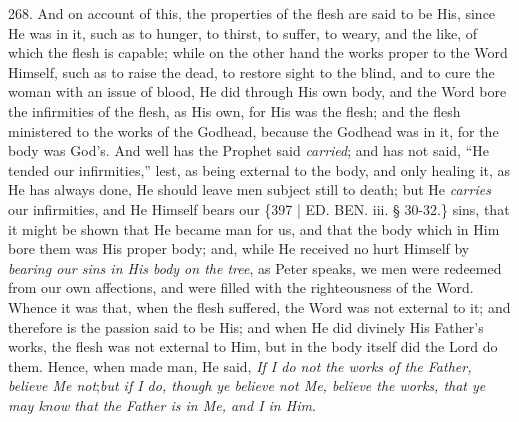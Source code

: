 268. And on account of
this, the properties of the flesh are said to be His, since He was in
it, such as to hunger, to thirst, to suffer, to weary, and the like,
of which the flesh is capable; while on the other hand the works
proper to the Word Himself, such as to raise the dead, to restore
sight to the blind, and to cure the woman with an issue of blood, He
did through His own body, and the Word bore the infirmities of the
flesh, as His own, for His was the flesh; and the flesh ministered to
the works of the Godhead, because the Godhead was in it, for the body
was God's. And well has the Prophet said \emph{carried}; and has not
said, ``He tended our infirmities,'' lest, as being external to the
body, and only healing it, as He has always done, He should leave men
subject still to death; but He \emph{carries} our infirmities, and He
Himself bears our \{397 | ED.
BEN.
iii. § 30-32.\} sins, that it might be shown that He became man for
us, and that the body which in Him bore them was His proper body; and,
while He received no hurt Himself by \emph{bearing our sins in His body
on the tree}, as Peter speaks, we men were redeemed from our own
affections, and were filled with the righteousness of the Word. Whence
it was that, when the flesh suffered, the Word was not external to it;
and therefore is the passion said to be His; and when He did divinely
His Father's works, the flesh was not external to Him, but in the body
itself did the Lord do them. Hence, when made man, He said, \emph{If I do
not the works of the Father, believe Me not};\emph{but if I do,
though ye believe not Me, believe the works, that ye may know that the
Father is in Me, and I in Him}.

